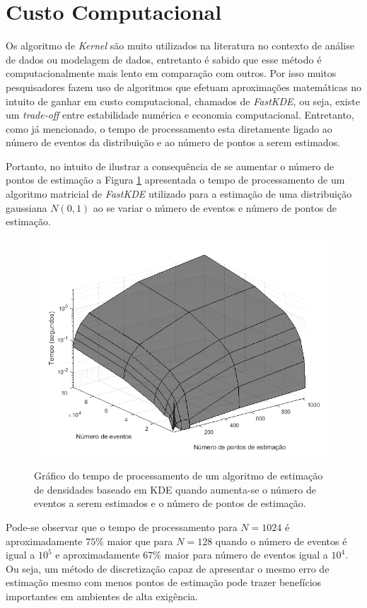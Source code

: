 \section{Custo Computacional}

Os algoritmo de \textit{Kernel} são muito utilizados na literatura no contexto de análise de dados ou modelagem de dados, entretanto é sabido que esse método é computacionalmente mais lento em comparação com outros. Por isso muitos pesquisadores fazem uso de algoritmos que efetuam aproximações matemáticas no intuito de ganhar em custo computacional, chamados de \textit{FastKDE}, ou seja, existe um \textit{trade-off} entre estabilidade numérica e economia computacional. Entretanto, como já mencionado, o tempo de processamento esta diretamente ligado ao número de eventos da distribuição e ao número de pontos a serem estimados.

Portanto, no intuito de ilustrar a consequência de se aumentar o número de pontos de estimação a Figura \ref{fig:compKDE} apresentada o tempo de processamento de um algoritmo matricial de \textit{FastKDE} utilizado para a estimação de uma distribuição gaussiana $N(0,1)$ ao se variar o número de eventos e número de pontos de estimação.

\begin{figure}[!ht]
	\centering
	\includegraphics[width=0.8\linewidth]{./figuras/custocomp.png}\\
	\caption{Gráfico do tempo de processamento de um algoritmo de estimação de densidades baseado em KDE quando aumenta-se o número de eventos a serem estimados e o número de pontos de estimação.}
	\label{fig:compKDE}
\end{figure}

Pode-se observar que o tempo de processamento para $N = 1024$ é aproximadamente $75\%$ maior que para $N = 128$ quando o número de eventos é igual a $10^5$ e aproximadamente $67\%$ maior para número de eventos igual a $10^4$. Ou seja, um método de discretização capaz de apresentar o mesmo erro de estimação mesmo com menos pontos de estimação pode trazer benefícios importantes em ambientes de alta exigência.



